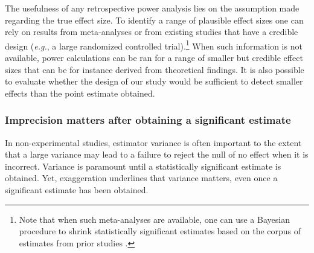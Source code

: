 \documentclass[usletter, 12pt]{article}
\begin{document}
				The usefulness of any retrospective power analysis lies on the assumption made regarding the true effect size. To identify a range of plausible effect sizes one can rely on results from meta-analyses or from existing studies that have a credible design (\textit{e.g.}, a large randomized controlled trial).\footnote{Note that when such meta-analyses are available, one can use a Bayesian procedure to shrink statistically significant estimates based on the corpus of estimates from prior studies \cite{zwet_proposal_2021, zwet_significance_2021, zwet_statistical_2021} .} When such information is not available, power calculations can be ran for a range of smaller but credible effect sizes that can be for instance derived from theoretical findings. It is also possible to evaluate whether the design of our study would be sufficient to detect smaller effects than the point estimate obtained.
				
		
		
		\subsubsection{Imprecision matters after obtaining a significant estimate}
			
				In non-experimental studies, estimator variance is often important to the extent that a large variance may lead to a failure to reject the null of no effect when it is incorrect. Variance is paramount until a statistically significant estimate is obtained. Yet, exaggeration underlines that variance matters, even once a significant estimate has been obtained. 
			
\end{document}
